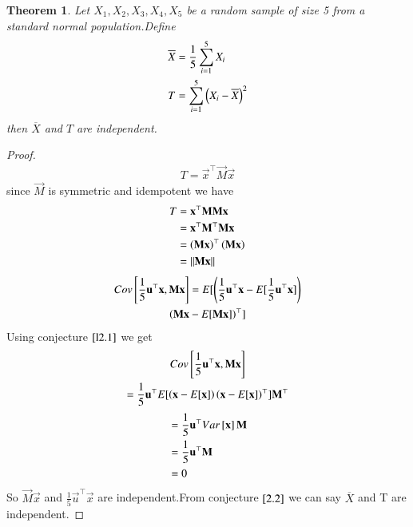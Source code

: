\documentclass[journal,12pt,twocolumn]{IEEEtran}
\newtheorem{theorem}{Theorem}[section]
\begin{document}
\begin{theorem}
Let $X_1,X_2,X_3,X_4,X_5$ be a  random sample of size 5 from a standard normal population.Define
\begin{align}
    \overline{X}&=\frac{1}{5}\sum_{i=1}^5X_i\\
    T&=\sum_{i=1}^{5}\left(X_i-\overline{X}\right)^2
\end{align}
then $\overline{X}$ and $T$ are independent.
\end{theorem}
\begin{proof}
\begin{align}
    T=\vec{x}^{\top}\vec{M}\vec{x}
\end{align}
since $\vec{M}$ is symmetric and idempotent we have
\begin{align}
   T&=\mathbf{x}^{\top}\mathbf{M}\mathbf{M}\mathbf{x}\\
    &=\mathbf{x}^{\top}\mathbf{M}^{\top}\mathbf{M}\mathbf{x}\\
    &=\left(\mathbf{M}\mathbf{x}\right)^{\top}\left(\mathbf{M}\mathbf{x}\right)\\
    &=\lVert\mathbf{M}\mathbf{x}\rVert\label{3.5} 
\end{align}
\begin{multline}
    Cov{}\left[\frac{1}{5}\mathbf{u}^{\top}\mathbf{x},\mathbf{M}\mathbf{x}\right]=E[ \left(\frac{1}{5}\mathbf{u}^{\top}\mathbf{x}-E[ \frac{1}{5}\mathbf{u}^{\top}\mathbf{x} ]\right)\\\left(\mathbf{M}\mathbf{x}-E[ \mathbf{M}\mathbf{x} ]\right)^{\top} ]
\end{multline}
Using conjecture $\ref{l2.1}$ we get
\begin{multline}
  Cov{}\left[\frac{1}{5}\mathbf{u}^{\top}\mathbf{x},\mathbf{M}\mathbf{x}\right]\\=\frac{1}{5}\mathbf{u}^{\top}E[ \left(\mathbf{x}-E[ \mathbf{x} ]\right)\left(\mathbf{x}-E[ \mathbf{x} ]\right)^{\top} ]\mathbf{M}^{\top}  
\end{multline}
\begin{align}
    &=\frac{1}{5}\mathbf{u}^{\top}Var{}\left[\mathbf{x}\right]\mathbf{M}\\
    &=\frac{1}{5}\mathbf{u}^{\top}\mathbf{M}\\
    &=0
\end{align}
So $\vec{M}\vec{x}$ and $\frac{1}{5}\vec{u}^{\top}\vec{x}$ are independent.From conjecture $\ref{2.2}$ we can say $\overline{X}$ and T are independent.
\end{proof}
\end{document}
